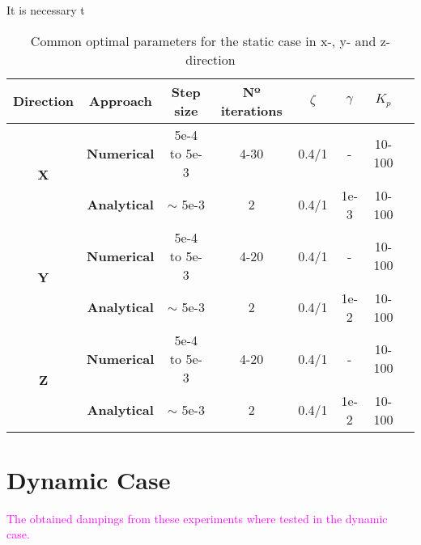 \begin{table}[]It is necessary t
	\centering
	\caption{Common optimal parameters for the static case in x-, y- and z-direction}
	\label{table:table_SC}
	\begin{tabular}{|c|c|c|c|c|c|c|c|}
		\hline
		\textbf{Direction}          & \textbf{Approach}   & \textbf{Step size} & \textbf{Nº iterations} & \textbf{$\zeta$} & \textbf{$\gamma$} & \textbf{$K_p$}  \\ \hline
		\multirow{2}{*}{\textbf{X}} & \textbf{Numerical}  & 5e-4 to 5e-3       & 4-30                          & 0.4/1                   & -             & 10-100                    \\ 
		& \textbf{Analytical} & $\sim$ 5e-3       & 2                             & 0.4/1                   & 1e-3       & 10-100                          \\ \hline
		\multirow{2}{*}{\textbf{Y}} & \textbf{Numerical}  & 5e-4 to 5e-3       & 4-20                          & 0.4/1                  & -                    & 10-100               \\ 
		& \textbf{Analytical} & $\sim$ 5e-3       & 2                             & 0.4/1                  & 1e-2        & 10-100                        \\ \hline
		\multirow{2}{*}{\textbf{Z}} & \textbf{Numerical}  & 5e-4 to 5e-3       & 4-20                          & 0.4/1                   & -                         & 10-100           \\ 
		& \textbf{Analytical} & $\sim$ 5e-3       & 2                             & 0.4/1                  & 1e-2      & 10-100         \\ \hline                 
	\end{tabular}
\end{table}












\section{Dynamic Case}
\label{sec:dynamic_case}

\textcolor{magenta}{The obtained dampings from these experiments where tested in the dynamic case.}

